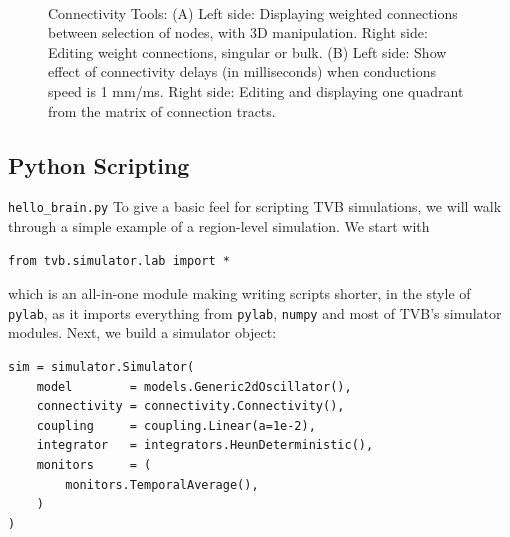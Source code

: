  \begin{figure}[!htbp]
    \centering
    \\
    \caption{Connectivity Tools: 
    (A) Left side: Displaying weighted connections between selection of nodes, with 3D manipulation.
    Right side: Editing weight connections, singular or bulk.
    (B) Left side: Show effect of connectivity delays (in milliseconds) when conductions speed is 1 mm/ms.
    Right side: Editing and displaying one quadrant from the matrix of connection tracts.}
        \label{fig:connectivity}
\end{figure}



\subsection{Python Scripting}

\texttt{hello\_brain.py}
To give a basic feel for scripting TVB simulations, we will 
walk through a simple example of a region-level simulation. We 
start with

\begin{lstlisting}
from tvb.simulator.lab import *
\end{lstlisting}

\noindent which is an all-in-one module making writing scripts
shorter, in the style of \texttt{pylab}, as it imports everything
from \texttt{pylab}, \texttt{numpy} and most of TVB's simulator
modules. Next, we build a simulator object:

\begin{lstlisting}
sim = simulator.Simulator(
    model        = models.Generic2dOscillator(), 
    connectivity = connectivity.Connectivity(),
    coupling     = coupling.Linear(a=1e-2),
    integrator   = integrators.HeunDeterministic(),
    monitors     = (
        monitors.TemporalAverage(), 
    )
)
\end{lstlisting}

